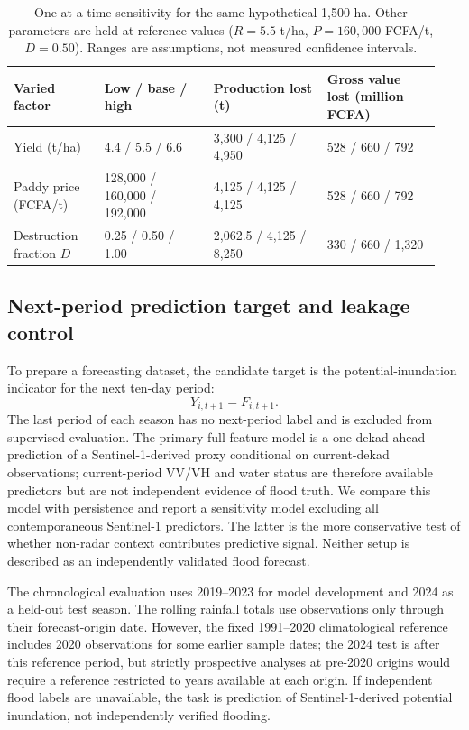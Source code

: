 \documentclass[pdflatex,sn-mathphys,Numbered]{sn-jnl}
\begin{document}
\begin{table}[t]
\centering
\caption{One-at-a-time sensitivity for the same hypothetical 1,500 ha. Other parameters are held at reference values ($R=5.5$ t/ha, $P=160{,}000$ FCFA/t, $D=0.50$). Ranges are assumptions, not measured confidence intervals.}
\label{tab:rice-loss-sensitivity}
\small
\begin{tabular}{p{0.20\linewidth}p{0.24\linewidth}p{0.25\linewidth}p{0.25\linewidth}}
\toprule
Varied factor & Low / base / high & Production lost (t) & Gross value lost (million FCFA) \\
\midrule
Yield (t/ha) & 4.4 / 5.5 / 6.6 & 3,300 / 4,125 / 4,950 & 528 / 660 / 792 \\
Paddy price (FCFA/t) & 128,000 / 160,000 / 192,000 & 4,125 / 4,125 / 4,125 & 528 / 660 / 792 \\
Destruction fraction $D$ & 0.25 / 0.50 / 1.00 & 2,062.5 / 4,125 / 8,250 & 330 / 660 / 1,320 \\
\bottomrule
\end{tabular}
\end{table}

\subsection{Next-period prediction target and leakage control}
To prepare a forecasting dataset, the candidate target is the potential-inundation indicator for the next ten-day period:
\begin{equation}
Y_{i,t+1}=F_{i,t+1}.
\end{equation}
The last period of each season has no next-period label and is excluded from supervised evaluation. The primary full-feature model is a one-dekad-ahead prediction of a Sentinel-1-derived proxy conditional on current-dekad observations; current-period VV/VH and water status are therefore available predictors but are not independent evidence of flood truth. We compare this model with persistence and report a sensitivity model excluding all contemporaneous Sentinel-1 predictors. The latter is the more conservative test of whether non-radar context contributes predictive signal. Neither setup is described as an independently validated flood forecast.

The chronological evaluation uses 2019--2023 for model development and 2024 as a held-out test season. The rolling rainfall totals use observations only through their forecast-origin date. However, the fixed 1991--2020 climatological reference includes 2020 observations for some earlier sample dates; the 2024 test is after this reference period, but strictly prospective analyses at pre-2020 origins would require a reference restricted to years available at each origin. If independent flood labels are unavailable, the task is prediction of Sentinel-1-derived potential inundation, not independently verified flooding.
\end{document}
